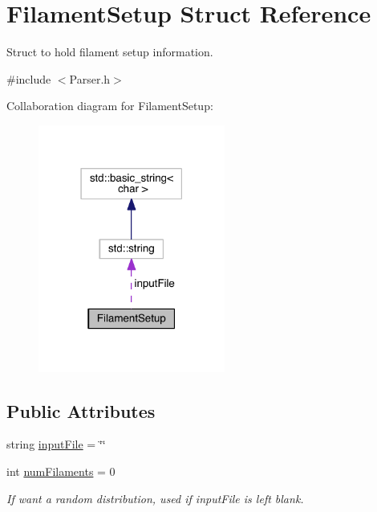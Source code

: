 \hypertarget{structFilamentSetup}{\section{Filament\+Setup Struct Reference}
\label{structFilamentSetup}
}


Struct to hold filament setup information.  




{\ttfamily \#include $<$Parser.\+h$>$}



Collaboration diagram for Filament\+Setup\+:\nopagebreak
\begin{figure}[H]
\begin{center}
\leavevmode
\includegraphics[width=174pt]{structFilamentSetup__coll__graph}
\end{center}
\end{figure}
\subsection*{Public Attributes}
\begin{DoxyCompactItemize}
\item 
string \hyperlink{structFilamentSetup_a242b250121191fe69bceeb99a32de4f7}{input\+File} = \char`\"{}\char`\"{}
\item 
int \hyperlink{structFilamentSetup_a0919341034ce0626e2de5fef2e7a6b66}{num\+Filaments} = 0
\begin{DoxyCompactList}\small\item\em If want a random distribution, used if input\+File is left blank. \end{DoxyCompactList}\end{DoxyCompactItemize}


